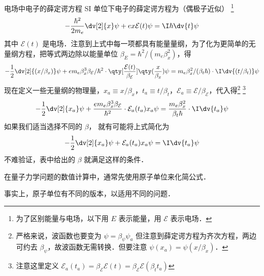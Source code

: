 
\begin{exam}{电场中电子的薛定谔方程} %
SI 单位下电子的薛定谔方程为（偶极子近似） \footnote{为了区别能量与电场，以下用 $E$ 表示能量，用 $\mathcal{E}$ 表示电场．} 
\begin{equation}
-\frac{\hbar^2}{2m_e} \dv[2]{x} \psi + e x\mathcal{E}(t)\psi= \I\hbar \dv{t} \psi
\end{equation}
其中 $\mathcal{E}(t)$ 是电场．注意到上式中每一项都具有能量量纲，为了化为更简单的无量纲方程，把等式两边除以能量单位 $\beta_E= \hbar^2/(m_e\beta_x^2)$，得
\begin{equation}\label{AU_eq3}
-\frac 12 \dv[2]{(x/\beta_x)} \psi + e m_e\beta_x^3\beta_\mathcal{E}/\hbar^2 \cdot \qty[\frac{\mathcal{E}(t)}{\beta_\mathcal{E}}] \qty(\frac{x}{\beta_x})\psi= m_e\beta_x^2/(\beta_t\hbar)\cdot\I \dv{(t/\beta_t)}\psi
\end{equation}
现在定义一些无量纲的物理量，$x_a \equiv x/\beta_x$，$t_a \equiv t/\beta_t$，$\mathcal{E}_a \equiv \mathcal{E}/\beta_\mathcal{E}$，代入得\footnote{严格来说，波函数也要变为 $\psi=\beta_\psi\psi_a$ 但注意到薛定谔方程为齐次方程，两边可约去 $\beta_\psi$，故波函数无需转换．但要注意 $\psi(x_a) = \psi(x/\beta_x)$．} \footnote{注意这里定义 $\mathcal{E}_a(t_a)=\beta_\mathcal{E}\mathcal{E}(t)=\beta_\mathcal{E}\mathcal{E}(\beta_t t_a)$}
\begin{equation}\label{AU_eq2}
-\frac 12 \dv[2]{x_a} \psi + \frac{e m_e\beta_x^3\beta_\mathcal{E}}{\hbar^2}\cdot \mathcal{E}_a(t_a) x_a\psi= \frac{m_e\beta_x^2}{\beta_t\hbar}\cdot\I \dv{t_a}\psi
\end{equation}
如果我们适当选择不同的 $\beta$， 就有可能将上式简化为
\begin{equation}\label{AU_eq1}
-\frac 12 \dv[2]{x_a}\psi +\mathcal{E}_a(t_a) x_a\psi= \I \dv{t_a}\psi
\end{equation}
不难验证，表中给出的 $\beta$ 就满足这样的条件．

在量子力学问题的数值计算中，通常先使用原子单位来化简公式．
\end{exam}

事实上，原子单位有不同的版本，以适用不同的问题．

